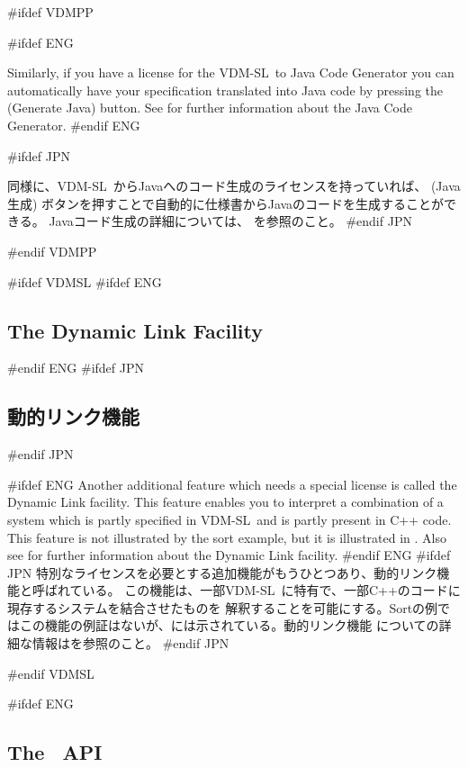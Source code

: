 \documentclass[\pformat,12pt]{article}
\newcommand{\vdmslpp}{VDM-SL}
\newcommand{\vdmslpp}{VDM++}
\newcommand{\guicmd}[1]{{\sf #1}}
\newcommand{\guicmd}[1]{{\gt #1}}
\begin{document}
#ifdef VDMPP

#ifdef ENG

Similarly, if you have a license  for the \vdmslpp\ to Java
Code Generator you can automatically have your specification
translated into Java code by pressing the 
(\guicmd{Generate Java}) button. See
\cite{CGJavaManPP-CSK} for further information about the Java Code
Generator.
#endif ENG

#ifdef JPN

同様に、\vdmslpp\ からJavaへのコード生成のライセンスを持っていれば、
(\guicmd{Java生成}) ボタンを押すことで自動的に仕様書からJavaのコードを生成することができる。
Javaコード生成の詳細については、\cite{CGJavaManPP-CSK} を参照のこと。
#endif JPN

#endif VDMPP

#ifdef VDMSL
#ifdef ENG
\subsection{The Dynamic Link Facility}
#endif ENG
#ifdef JPN
\subsection{動的リンク機能}
#endif JPN

#ifdef ENG
Another additional feature which needs a special license
 is 
called the Dynamic Link facility. This feature
enables you to interpret a 
combination of a system which is partly specified in \vdmslpp\ and is
partly present in C++ code. This feature is not
illustrated by the sort example, but it is illustrated in
\cite{DLMan-CSK}. Also see \cite{DLMan-CSK}
for further information about the Dynamic Link facility.
#endif ENG
#ifdef JPN
特別なライセンスを必要とする追加機能がもうひとつあり、動的リンク機能と呼ばれている。
この機能は、一部\vdmslpp\ に特有で、一部C++のコードに現存するシステムを結合させたものを
解釈することを可能にする。Sortの例ではこの機能の例証はないが、\cite{DLMan-CSK}には示されている。動的リンク機能
についての詳細な情報は\cite{DLMan-CSK}を参照のこと。
#endif JPN

#endif VDMSL

#ifdef ENG
\subsection{The \protect\VDMTools\ API}
\end{document}
